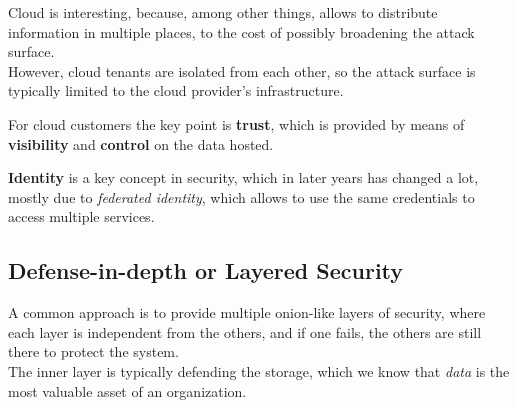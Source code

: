 Cloud is interesting, because, among other things, allows to distribute information in multiple places, to the cost of possibly broadening the attack surface.\\
However, cloud tenants are isolated from each other, so the attack surface is typically limited to the cloud provider's infrastructure.

For cloud customers the key point is \textbf{trust}, which is provided by means of \textbf{visibility} and \textbf{control} on the data hosted.


\textbf{Identity} is a key concept in security, which in later years has changed a lot, mostly due to \textit{federated identity}, which allows to use the same credentials to access multiple services.


\subsection{Defense-in-depth or Layered Security}
A common approach is to provide multiple onion-like layers of security, where each layer is independent from the others, and if one fails, the others are still there to protect the system.\\
The inner layer is typically defending the storage, which we know that \textit{data} is the most valuable asset of an organization.

